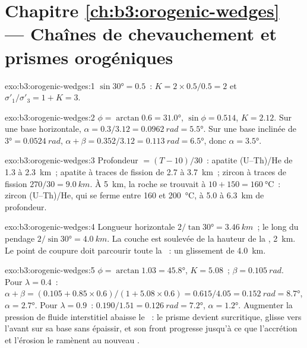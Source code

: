 \section*{Chapitre \ref{ch:b3:orogenic-wedges} --- Chaînes de chevauchement et prismes orogéniques}

\begin{solution}{exo:b3:orogenic-wedges:1}
$\sin\ang{30} = 0.5$~: $K = 2\times0.5/0.5 = 2$ et $\sigma'_1/\sigma'_3 = 1 +
K = 3$.
\end{solution}

\begin{solution}{exo:b3:orogenic-wedges:2}
$\phi = \arctan0.6 = \ang{31.0}$, $\sin\phi = 0.514$, $K = 2.12$. Sur une
base horizontale, $\alpha = 0.3/3.12 = \qty{0.0962}{rad} = \ang{5.5}$. Sur une
base inclinée de $\ang{3} = \qty{0.0524}{rad}$, $\alpha + \beta = 0.352/3.12 =
\qty{0.113}{rad} = \ang{6.5}$, donc $\alpha = \ang{3.5}$.
\end{solution}

\begin{solution}{exo:b3:orogenic-wedges:3}
Profondeur $= (T - 10)/30$~: apatite (U--Th)/He de 1.3 à \qty{2.3}{km}~; apatite à
traces de fission de 2.7 à \qty{3.7}{km}~; zircon à traces de fission $270/30 = \qty{9.0}{km}$. À
\qty{5}{km}, la roche se trouvait à $10 + 150 = \qty{160}{\celsius}$~: zircon
(U--Th)/He, qui se ferme entre 160 et \qty{200}{\celsius}, à 5.0 à
\qty{6.3}{km} de profondeur.
\end{solution}

\begin{solution}{exo:b3:orogenic-wedges:4}
Longueur horizontale $2/\tan\ang{30} = \qty{3.46}{km}$~; le long du pendage
$2/\sin\ang{30} = \qty{4.0}{km}$. La couche est soulevée de la hauteur de la ,
\qty{2}{km}. Le point de coupure doit parcourir toute la ~: un glissement de
\qty{4.0}{km}.
\end{solution}

\begin{solution}{exo:b3:orogenic-wedges:5}
$\phi = \arctan1.03 = \ang{45.8}$, $K = 5.08$~; $\beta = \qty{0.105}{rad}$.
Pour $\lambda = 0.4$~: $\alpha + \beta = (0.105 + 0.85\times0.6)/(1 +
5.08\times0.6) = 0.615/4.05 = \qty{0.152}{rad} = \ang{8.7}$, $\alpha =
\ang{2.7}$. Pour $\lambda = 0.9$~: $0.190/1.51 = \qty{0.126}{rad} = \ang{7.2}$,
$\alpha = \ang{1.2}$. Augmenter la pression de fluide interstitiel abaisse le ~:
le prisme devient surcritique, glisse vers l'avant sur sa base sans
épaissir, et son front progresse jusqu'à ce que l'accrétion et l'érosion le ramènent
au nouveau .
\end{solution}

